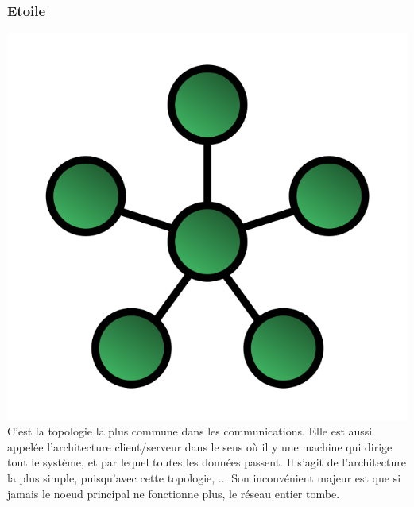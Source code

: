 	    \subsubsection{Etoile}
\includegraphics{img/StarNetwork.svg.png}
C'est la topologie la plus commune dans les communications. Elle est aussi appelée l'architecture 
client/serveur dans le sens où il y une machine qui dirige tout le système, et par lequel toutes les données 
passent. Il s'agit de l'architecture la plus simple, puisqu'avec cette topologie,  ... Son inconvénient 
majeur est que si jamais le noeud principal ne fonctionne plus, le réseau entier tombe.

